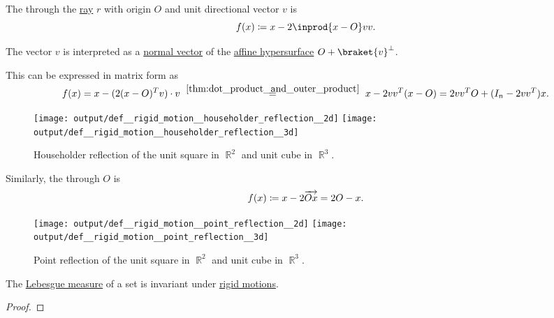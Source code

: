 \begin{definition}
\begin{thmenum}
     The  through the \hyperref[def:geometric_ray]{ray} \( r \) with origin \( O \) and unit directional vector \( v \) is
    \begin{equation*}
      f(x) \coloneqq x - 2 \inprod {x - O} v v.
    \end{equation*}

    The vector \( v \) is interpreted as a \hyperref[def:normal_vector]{normal vector} of the \hyperref[def:affine_hyperplane]{affine hypersurface} \( O + \braket{ v }^\perp \).

    This can be expressed in matrix form as
    \begin{equation*}
      f(x)
      =
      x - (2 (x - O)^T v) \cdot v
      \reloset {\ref{thm:dot_product_and_outer_product}} =
      x - 2 v v^T (x - O)
      =
      2 v v^T O + (I_n - 2 v v^T) x.
    \end{equation*}

    \begin{figure}[!ht]
      \hfill
      \texttt{[image: output/def\_\_rigid\_motion\_\_householder\_reflection\_\_2d]}
      \hfill
      \texttt{[image: output/def\_\_rigid\_motion\_\_householder\_reflection\_\_3d]}
      \hfill
      \hfill
      \caption{Householder reflection of the unit square in \( \BbbR^2 \) and unit cube in \( \BbbR^3 \).}\label{fig:def:rigid_motion/householder_reflection}
    \end{figure}

     Similarly, the  through \( O \) is
    \begin{equation*}
      f(x) \coloneqq x - 2\overrightarrow{Ox} = 2O - x.
    \end{equation*}

    \begin{figure}[!ht]
      \hfill
      \texttt{[image: output/def\_\_rigid\_motion\_\_point\_reflection\_\_2d]}
      \hfill
      \texttt{[image: output/def\_\_rigid\_motion\_\_point\_reflection\_\_3d]}
      \hfill
      \hfill
      \caption{Point reflection of the unit square in \( \BbbR^2 \) and unit cube in \( \BbbR^3 \).}\label{fig:def:rigid_motion/point_reflection}
    \end{figure}
  \end{thmenum}
\end{definition}

\begin{proposition}\label{thm:lebesgue_measure_invariant_under_rigid_motions}
  The \hyperref[def:lebesgue_measure]{Lebesgue measure} of a set is invariant under \hyperref[def:rigid_motion]{rigid motions}.
\end{proposition}
\begin{proof}
\end{proof}

